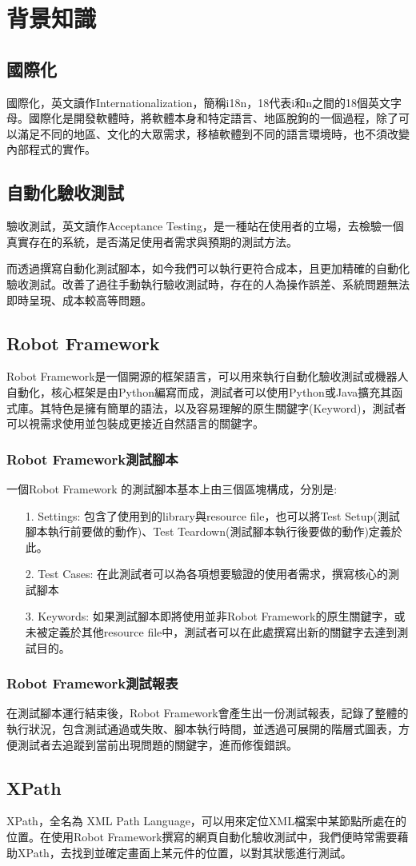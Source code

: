\chapter{背景知識}


\section{國際化}
國際化\cite{internationalization}，英文讀作Internationalization，簡稱i18n，18代表i和n之間的18個英文字母。國際化是開發軟體時，將軟體本身和特定語言、地區脫鉤的一個過程，除了可以滿足不同的地區、文化的大眾需求，移植軟體到不同的語言環境時，也不須改變內部程式的實作。

\section{自動化驗收測試}
驗收測試\cite{se}，英文讀作Acceptance Testing，是一種站在使用者的立場，去檢驗一個真實存在的系統，是否滿足使用者需求與預期的測試方法。

而透過撰寫自動化測試腳本\cite{AT}，如今我們可以執行更符合成本，且更加精確的自動化驗收測試。改善了過往手動執行驗收測試時，存在的人為操作誤差、系統問題無法即時呈現、成本較高等問題。

\section{Robot Framework}
Robot Framework\cite{rf}\cite{rfguide}是一個開源的框架語言，可以用來執行自動化驗收測試或機器人自動化，核心框架是由Python\cite{python}編寫而成，測試者可以使用Python或Java擴充其函式庫。其特色是擁有簡單的語法，以及容易理解的原生關鍵字(Keyword)，測試者可以視需求使用並包裝成更接近自然語言的關鍵字。

\subsection{Robot Framework測試腳本}
一個Robot Framework 的測試腳本基本上由三個區塊構成，分別是:
\begin{itemize}
    \item[1.]Settings: 包含了使用到的library與resource file，也可以將Test Setup(測試腳本執行前要做的動作)、Test Teardown(測試腳本執行後要做的動作)定義於此。
    \item[2.]Test Cases: 在此測試者可以為各項想要驗證的使用者需求，撰寫核心的測試腳本
    \item[3.]Keywords: 如果測試腳本即將使用並非Robot Framework的原生關鍵字，或未被定義於其他resource file中，測試者可以在此處撰寫出新的關鍵字去達到測試目的。
\end{itemize}

\subsection{Robot Framework測試報表}
在測試腳本運行結束後，Robot Framework會產生出一份測試報表，記錄了整體的執行狀況，包含測試通過或失敗、腳本執行時間，並透過可展開的階層式圖表，方便測試者去追蹤到當前出現問題的關鍵字，進而修復錯誤。

\section{XPath}
XPath\cite{xpath}，全名為 XML Path Language，可以用來定位XML檔案中某節點所處在的位置。在使用Robot Framework撰寫的網頁自動化驗收測試中，我們便時常需要藉助XPath，去找到並確定畫面上某元件的位置，以對其狀態進行測試。